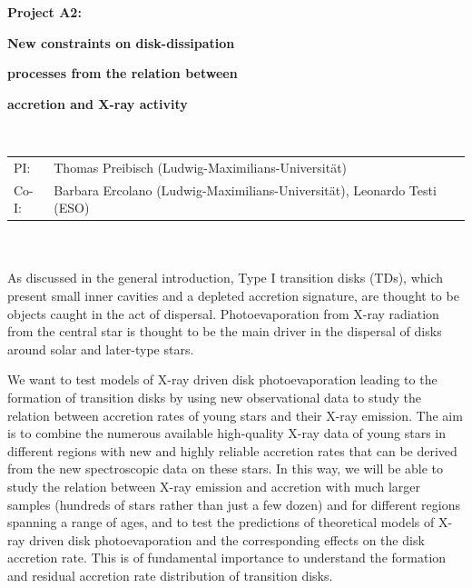 \documentclass[10pt,fleqn,twoside]{article}
\newcommand{\Tcol}{\color{blue}}
\begin{document}
\newpage


\setcounter{page}{1}

\centerline{\huge\bf\Tcol
%
%
%
%
%
 Project A2:}
\vspace{1em}

\centerline{\LARGE\bf\Tcol New constraints on disk-dissipation}

\centerline{\LARGE\bf\Tcol processes from the
relation between}

\centerline{\LARGE\bf\Tcol  accretion and  X-ray activity}

%
%
%
%
%
\vskip1.0cm


\\
\begin{tabular}{ll}
{\textsf{PI:}}                   & Thomas Preibisch (Ludwig-Maximilians-Universit\"at) \\
{\textsf{Co-I:}}                & Barbara Ercolano (Ludwig-Maximilians-Universit\"at), Leonardo Testi (ESO)\\
\end{tabular}


\vspace{1em}
 \\

\vspace{1em}
\\
As discussed in the general introduction, Type I transition disks
(TDs), which present small inner cavities and a depleted accretion
signature, are thought to be objects caught in the act of
dispersal. Photoevaporation from X-ray radiation from the central
star is thought to be the main driver in the dispersal of disks around
solar and later-type stars. 

We want to test models of X-ray driven disk photoevaporation leading
to the formation of transition disks by using
new observational data to study the relation between accretion rates of young stars and
their X-ray emission.
The aim is to combine the numerous available high-quality
X-ray data of young stars  in different regions with new and highly reliable 
accretion rates that can be derived from the new spectroscopic data on these stars.
In this way, we will be able to study the relation between X-ray emission
and accretion with much larger samples (hundreds of stars rather
than just a few dozen) and for different regions spanning a range
of ages, and to test the predictions of theoretical models of
X-ray driven disk photoevaporation and the corresponding effects on
the disk accretion rate. This is of fundamental importance to
understand the formation and residual accretion rate distribution of
transition disks. 
\end{document}
